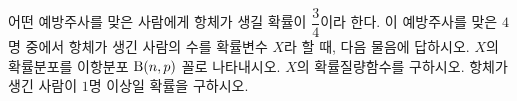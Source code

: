 어떤 예방주사를 맞은 사람에게 항체가 생길 확률이 $\dfrac{3}{4}$이라 한다. 이 예방주사를 맞은 $4$명 중에서 항체가 생긴 사람의 수를 확률변수 $X$라 할 때, 다음 물음에 답하시오.
 $X$의 확률분포를 이항분포 $\mathrm{B}(n{,}\mkern3mu\mathopen{}p)$ 꼴로 나타내시오.
 $X$의 확률질량함수를 구하시오.
 항체가 생긴 사람이 $1$명 이상일 확률을 구하시오.
